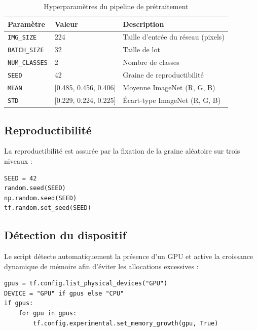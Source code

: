 \begin{table}[h!]
  \centering
  \renewcommand{\arraystretch}{1.4}
  \begin{tabular}{lll}
    \toprule
    \textbf{Paramètre} & \textbf{Valeur} & \textbf{Description} \\
    \midrule
    \texttt{IMG\_SIZE}   & 224            & Taille d'entrée du réseau (pixels) \\
    \texttt{BATCH\_SIZE} & 32             & Taille de lot \\
    \texttt{NUM\_CLASSES}& 2              & Nombre de classes \\
    \texttt{SEED}        & 42             & Graine de reproductibilité \\
    \texttt{MEAN}        & [0.485, 0.456, 0.406] & Moyenne ImageNet (R, G, B) \\
    \texttt{STD}         & [0.229, 0.224, 0.225] & Écart-type ImageNet (R, G, B) \\
    \bottomrule
  \end{tabular}
  \caption{Hyperparamètres du pipeline de prétraitement}
\end{table}

\subsection{Reproductibilité}

La reproductibilité est assurée par la fixation de la graine aléatoire sur trois niveaux :

\begin{lstlisting}[caption={Fixation des graines}]
SEED = 42
random.seed(SEED)
np.random.seed(SEED)
tf.random.set_seed(SEED)
\end{lstlisting}

\subsection{Détection du dispositif}

Le script détecte automatiquement la présence d'un GPU et active la croissance dynamique de mémoire afin d'éviter les allocations excessives :

\begin{lstlisting}[caption={Détection GPU et gestion mémoire}]
gpus = tf.config.list_physical_devices("GPU")
DEVICE = "GPU" if gpus else "CPU"
if gpus:
    for gpu in gpus:
        tf.config.experimental.set_memory_growth(gpu, True)
\end{lstlisting}


